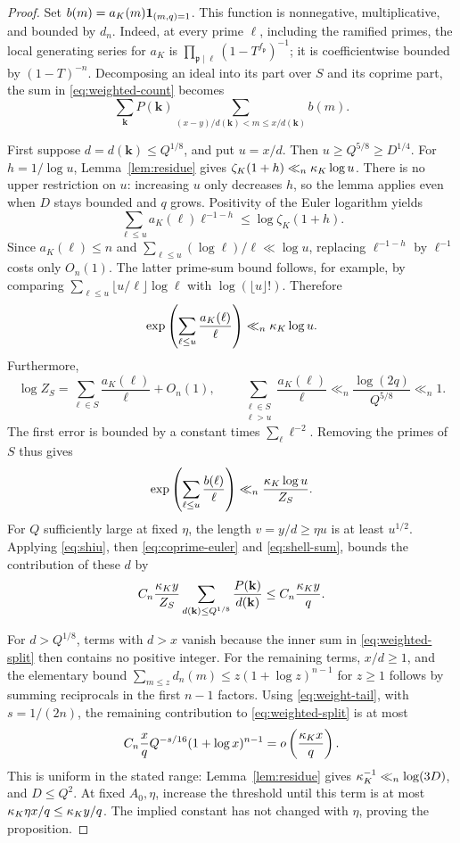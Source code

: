 \begin{proof}
Set $b(m)=a_K(m)\mathbf 1_{(m,q)=1}$. This function is nonnegative,
multiplicative, and bounded by $d_n$. Indeed, at every prime $\ell$,
including the ramified primes, the local generating series for
$a_K$ is $\prod_{\mathfrak p\mid\ell}(1-T^{f_{\mathfrak p}})^{-1}$;
it is coefficientwise bounded by $(1-T)^{-n}$.
Decomposing an ideal into its part over $S$ and its coprime part,
the sum in \eqref{eq:weighted-count} becomes
\begin{equation}\label{eq:weighted-split}
 \sum_{\mathbf k}P(\mathbf k)
       \sum_{(x-y)/d(\mathbf k)<m\le x/d(\mathbf k)}b(m).
\end{equation}

First suppose $d=d(\mathbf k)\le Q^{1/8}$, and put $u=x/d$.
Then $u\ge Q^{5/8}\ge D^{1/4}$. For $h=1/\log u$,
Lemma~\ref{lem:residue} gives
$\zeta_K(1+h)\ll_n\kappa_K\log u$.
There is no upper restriction on $u$: increasing $u$ only decreases
$h$, so the lemma applies even when $D$ stays bounded and $q$ grows.
Positivity of the Euler logarithm yields
\[
 \sum_{\ell\le u}a_K(\ell)\ell^{-1-h}\le\log\zeta_K(1+h).
\]
Since $a_K(\ell)\le n$ and
$\sum_{\ell\le u}(\log\ell)/\ell\ll\log u$, replacing
$\ell^{-1-h}$ by $\ell^{-1}$ costs only $O_n(1)$.
The latter prime-sum bound follows, for example, by comparing
$\sum_{\ell\le u}\lfloor u/\ell\rfloor\log\ell$ with
$\log(\lfloor u\rfloor!)$. Therefore
\[
 \exp\left(\sum_{\ell\le u}\frac{a_K(\ell)}\ell\right)
 \ll_n\kappa_K\log u.
\]
Furthermore,
\[
 \log Z_S=\sum_{\ell\in S}\frac{a_K(\ell)}\ell+O_n(1),
 \qquad
 \sum_{\substack{\ell\in S\\\ell>u}}
       \frac{a_K(\ell)}\ell
 \ll_n\frac{\log(2q)}{Q^{5/8}}\ll_n1.
\]
The first error is bounded by a constant times
$\sum_\ell\ell^{-2}$. Removing the primes of $S$ thus gives
\begin{equation}\label{eq:coprime-euler}
 \exp\left(\sum_{\ell\le u}\frac{b(\ell)}\ell\right)
 \ll_n\frac{\kappa_K\log u}{Z_S}.
\end{equation}
For $Q$ sufficiently large at fixed $\eta$, the length
$v=y/d\ge\eta u$ is at least $u^{1/2}$.
Applying \eqref{eq:shiu}, then \eqref{eq:coprime-euler} and
\eqref{eq:shell-sum}, bounds the contribution of these $d$ by
\[
 C_n\frac{\kappa_K y}{Z_S}
       \sum_{d(\mathbf k)\le Q^{1/8}}\frac{P(\mathbf k)}{d(\mathbf k)}
 \le C_n\frac{\kappa_K y}{q}.
\]

For $d>Q^{1/8}$, terms with $d>x$ vanish because the inner sum
in \eqref{eq:weighted-split} then contains no positive integer.
For the remaining terms, $x/d\ge1$, and the elementary bound
$\sum_{m\le z}d_n(m)\le z(1+\log z)^{n-1}$ for $z\ge1$
follows by summing reciprocals in the first $n-1$ factors.
Using \eqref{eq:weight-tail}, with $s=1/(2n)$, the remaining
contribution to \eqref{eq:weighted-split} is at most
\[
 C_n\frac{x}{q}Q^{-s/16}(1+\log x)^{n-1}
 =o\left(\frac{\kappa_K x}{q}\right).
\]
This is uniform in the stated range: Lemma~\ref{lem:residue}
gives $\kappa_K^{-1}\ll_n\log(3D)$, and $D\le Q^2$.
At fixed $A_0,\eta$, increase the threshold until this term is at
most $\kappa_K\eta x/q\le\kappa_K y/q$. The implied constant has
not changed with $\eta$, proving the proposition.
\end{proof}
